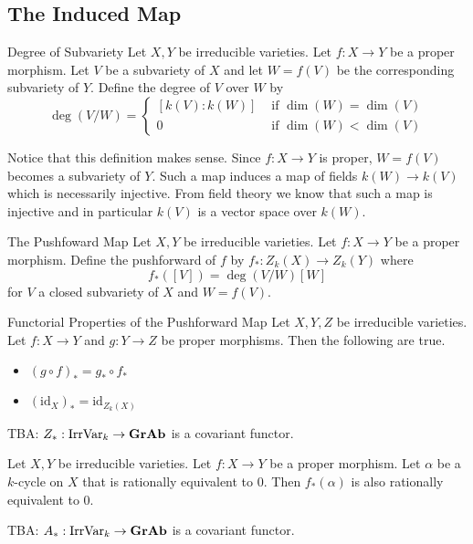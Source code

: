 \documentclass[a4paper]{article}
\begin{document}
\subsection{The Induced Map}
\begin{defn}{Degree of Subvariety}{} Let $X,Y$ be irreducible varieties. Let $f:X\to Y$ be a proper morphism. Let $V$ be a subvariety of $X$ and let $W=f(V)$ be the corresponding subvariety of $Y$. Define the degree of $V$ over $W$ by $$\deg(V/W)=\begin{cases}
[k(V):k(W)] & \text{ if } \dim(W)=\dim(V)\\
0 & \text{ if } \dim(W)<\dim(V)
\end{cases}$$
\end{defn}

Notice that this definition makes sense. Since $f:X\to Y$ is proper, $W=f(V)$ becomes a subvariety of $Y$. Such a map induces a map of fields $k(W)\to k(V)$ which is necessarily injective. From field theory we know that such a map is injective and in particular $k(V)$ is a vector space over $k(W)$. 

\begin{defn}{The Pushfoward Map}{} Let $X,Y$ be irreducible varieties. Let $f:X\to Y$ be a proper morphism. Define the pushforward of $f$ by $f_\ast:Z_k(X)\to Z_k(Y)$ where $$f_\ast([V])=\deg(V/W)[W]$$ for $V$ a closed subvariety of $X$ and $W=f(V)$. 
\end{defn}

\begin{lmm}{Functorial Properties of the Pushforward Map}{} Let $X,Y,Z$ be irreducible varieties. Let $f:X\to Y$ and $g:Y\to Z$ be proper morphisms. Then the following are true. 
\begin{itemize}
\item $(g\circ f)_\ast=g_\ast\circ f_\ast$
\item $(\text{id}_X)_\ast=\text{id}_{Z_k(X)}$
\end{itemize}
\end{lmm}

TBA: $Z_\ast:\text{IrrVar}_k\to\bold{GrAb}$ is a covariant functor. 

\begin{thm}{}{} Let $X,Y$ be irreducible varieties. Let $f:X\to Y$ be a proper morphism. Let $\alpha$ be a $k$-cycle on $X$ that is rationally equivalent to $0$. Then $f_\ast(\alpha)$ is also rationally equivalent to $0$. 
\end{thm}

TBA: $A_\ast:\text{IrrVar}_k\to\bold{GrAb}$ is a covariant functor. 
\end{document}
